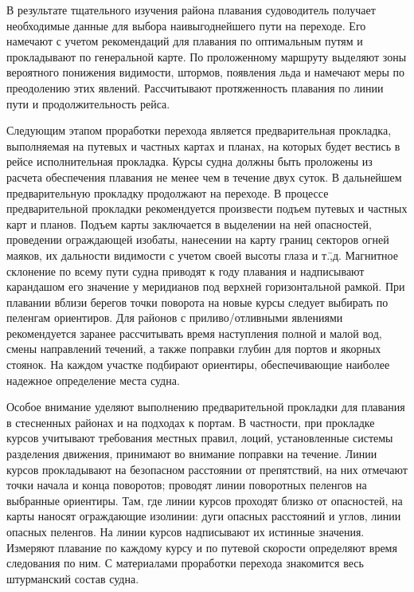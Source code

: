 В результате тщательного изучения района плавания судоводитель
получает необходимые данные для выбора наивыгоднейшего пути на
переходе. Его намечают с учетом рекомендаций для плавания по
оптимальным путям и прокладывают по генеральной карте. По проложенному
маршруту выделяют зоны вероятного понижения видимости, штормов,
появления льда и намечают меры по преодолению этих
явлений. Рассчитывают протяженность плавания по линии пути и
продолжительность рейса.
 
Следующим этапом проработки перехода является предварительная
прокладка, выполняемая на путевых и частных картах и планах, на
которых будет вестись в рейсе исполнительная прокладка. Курсы судна
должны быть проложены из расчета обеспечения плавания не менее чем в
течение двух суток. В дальнейшем предварительную прокладку продолжают
на переходе. В процессе предварительной прокладки рекомендуется
произвести подъем путевых и частных карт и планов. Подъем карты
заключается в выделении на ней опасностей, проведении ограждающей
изобаты, нанесении на карту границ секторов огней маяков, их дальности
видимости с учетом своей высоты глаза и т.\=,д. Магнитное склонение по
всему пути судна приводят к году плавания и надписывают карандашом его
значение у меридианов под верхней горизонтальной рамкой. При плавании
вблизи берегов точки поворота на новые курсы следует выбирать по
пеленгам ориентиров. Для районов с приливо\-/отливными явлениями
рекомендуется заранее рассчитывать время наступления полной и малой
вод, смены направлений течений, а также поправки глубин для портов и
якорных стоянок. На каждом участке подбирают ориентиры, обеспечивающие
наиболее надежное определение места судна.
 
Особое внимание уделяют выполнению предварительной прокладки для
плавания в стесненных районах и на подходах к портам. В частности, при
прокладке курсов учитывают требования местных правил, лоций,
установленные системы разделения движения, принимают во внимание
поправки на течение. Линии курсов прокладывают на безопасном
расстоянии от препятствий, на них отмечают точки начала и конца
поворотов; проводят линии поворотных пеленгов на выбранные
ориентиры. Там, где линии курсов проходят близко от опасностей, на
карты наносят ограждающие изолинии: дуги опасных расстояний и углов,
линии опасных пеленгов. На линии курсов надписывают их истинные
значения. Измеряют плавание по каждому курсу и по путевой скорости
определяют время следования по ним. С материалами проработки перехода
знакомится весь штурманский состав судна.

